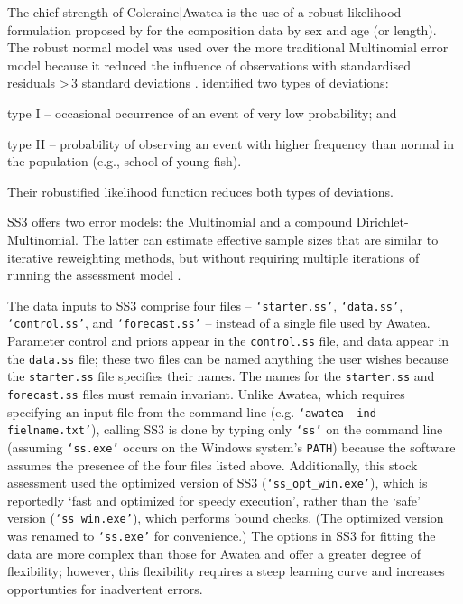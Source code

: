 \documentclass[11pt]{book}
\newcommand{\code}[1]{\normalsize\texttt{#1}\normalsize}%
\begin{document}
The chief strength of Coleraine|Awatea is the use of a robust likelihood formulation proposed by \citet{Fournier-etal:1998} for the composition data by sex and age (or length).
The robust normal model was used over the more traditional Multinomial error model because it reduced the influence of observations with standardised residuals >\,3 standard deviations \citep{Fournier-etal:1990}.
\citet{Fournier-etal:1990} identified two types of deviations:
\begin{itemize_csas}{}{}
	\item type I -- occasional occurrence of an event of very low probability; and
	\item type II -- probability of observing an event with higher frequency than normal in the population (e.g., school of young fish).
\end{itemize_csas}
Their robustified likelihood function reduces both types of deviations.

SS3 offers two error models: the Multinomial and a compound Dirichlet-Multinomial.
The latter can estimate effective sample sizes that are similar to iterative reweighting methods, but without requiring multiple iterations of running the assessment model \citep{Thorson-etal:2017}.

The data inputs to SS3 comprise four files -- \code{`starter.ss'}, \code{`data.ss'}, \code{`control.ss'}, and \code{`forecast.ss'} -- instead of a single file used by Awatea.
Parameter control and priors appear in the \code{control.ss} file, and data appear in the \code{data.ss} file; these two files can be named anything the user wishes because the \code{starter.ss} file specifies their names.
The names for the \code{starter.ss} and \code{forecast.ss} files must remain invariant.
Unlike Awatea, which requires specifying an input file from the command line (e.g. \code{`awatea -ind fielname.txt'}), calling SS3 is done by typing only \code{`ss'} on the command line (assuming \code{`ss.exe'} occurs on the Windows system's \code{PATH}) because the software assumes the presence of the four files listed above.
Additionally, this stock assessment used the optimized version of SS3 (\code{`ss\_opt\_win.exe'}), which is reportedly `fast and optimized for speedy execution', rather than the `safe' version (\code{`ss\_win.exe'}), which performs bound checks.
(The optimized version was renamed to \code{`ss.exe'} for convenience.)
The options in SS3 for fitting the data are more complex than those for Awatea and offer a greater degree of flexibility; however, this flexibility requires a steep learning curve and increases opportunties for inadvertent errors.
\end{document}

